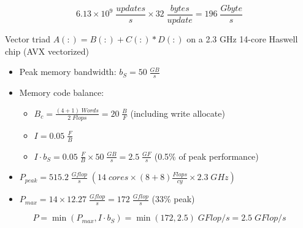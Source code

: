 \documentclass{article}
\begin{document}
\begin{enumerate}
\begin{equation*}
 6.13 \times 10^9 \; \frac{updates}{s} \times 32 \;\frac{bytes}{update} = 196 \; \frac{Gbyte}{s}
\end{equation*}

Vector triad $A(:)=B(:)+C(:)*D(:)$ on a 2.3 GHz 14-core Haswell chip (AVX vectorized)
\begin{itemize}
\item Peak memory bandwidth: $b_S = 50 \; \frac{GB}{s}$
\item Memory code balance:
\begin{itemize}
\item $B_c = \frac{(4+1) \; Words}{2 \; Flops} = 20 \; \frac{B}{F}$ (including write allocate)
\item $I = 0.05 \; \frac{F}{B}$
\item $I \cdot b_S = 0.05 \; \frac{F}{B} \times 50 \; \frac{GB}{s} = 2.5 \; \frac{GF}{s}$ (0.5\% of peak performance)
\end{itemize}
\end{itemize}


\begin{itemize}
 \item $P_{peak} = 515.2 \; \frac{Gflop}{s} \; (14 \;cores \times (8+8) \frac{Flops}{cy} \times 2.3 \;GHz)$
\item $P_{max} = 14 \times 12.27 \; \frac{Gflop}{s} = 172\; \frac{Gflop}{s}$ (33\% peak)
\end{itemize}

\begin{equation}
P= \min \left(P_{max}, I \cdot b_S\right) = \min \left(172,2.5\right) \; GFlop/s = 2.5 \; GFlop/s
\end{equation}




\end{enumerate}
\end{document}
